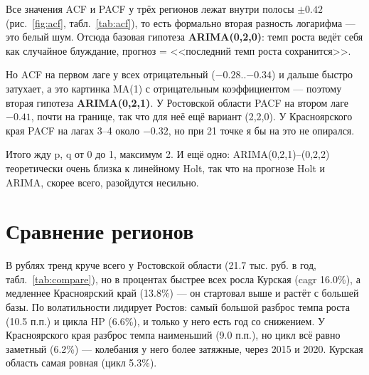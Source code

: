 \documentclass[12pt,a4paper]{report}
\begin{document}
Все значения ACF и PACF у трёх регионов лежат внутри полосы $\pm 0.42$ (рис.~\ref{fig:acf}, табл.~\ref{tab:acf}), то есть формально вторая разность логарифма --- это белый шум. Отсюда базовая гипотеза \textbf{ARIMA(0,2,0)}: темп роста ведёт себя как случайное блуждание, прогноз = <<последний темп роста сохранится>>.

Но ACF на первом лаге у всех отрицательный ($-0.28$..$-0.34$) и дальше быстро затухает, а это картинка MA(1) с отрицательным коэффициентом --- поэтому вторая гипотеза \textbf{ARIMA(0,2,1)}. У Ростовской области PACF на втором лаге $-0.41$, почти на границе, так что для неё ещё вариант (2,2,0). У Красноярского края PACF на лагах 3--4 около $-0.32$, но при 21 точке я бы на это не опирался.

Итого жду p, q от 0 до 1, максимум 2. И ещё одно: ARIMA(0,2,1)--(0,2,2) теоретически очень близка к линейному Holt, так что на прогнозе Holt и ARIMA, скорее всего, разойдутся несильно.

\section{Сравнение регионов}

\begin{table}[H]
\centering
\caption{Сравнение выбранных регионов}
\label{tab:compare}
\small
{}
\end{table}

В рублях тренд круче всего у Ростовской области (21.7 тыс. руб. в год, табл.~\ref{tab:compare}), но в процентах быстрее всех росла Курская (cagr 16.0\%), а медленнее Красноярский край (13.8\%) --- он стартовал выше и растёт с большей базы. По волатильности лидирует Ростов: самый большой разброс темпа роста (10.5 п.п.) и цикла HP (6.6\%), и только у него есть год со снижением. У Красноярского края разброс темпа наименьший (9.0 п.п.), но цикл всё равно заметный (6.2\%) --- колебания у него более затяжные, через 2015 и 2020. Курская область самая ровная (цикл 5.3\%).
\end{document}
